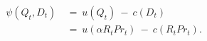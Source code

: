 \begin{equation}
\begin{split}
     \psi(Q_{t}, D_{t}) \ 
     & = \ u(Q_{t}) \ - \ c(D_{t}) \\
     & = \ u(\alpha R_{t} Pr_{t}) \ - \ c(R_{t} Pr_{t}).
\end{split}
\label{Equation:DCDP-Model_Payoff-Function_Social-Planners-Problem}
\end{equation}